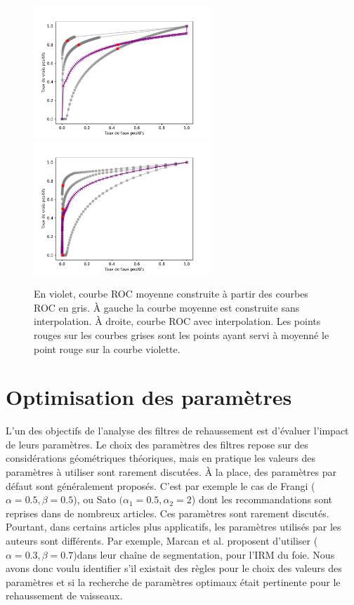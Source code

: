 \begin{figure}[ht]
  \centering
  \includegraphics[height=5cm]{Images/ROC_badMean.pdf}
  \includegraphics[height=5cm]{Images/ROC_goodMean.pdf}
  \caption{En violet, courbe ROC moyenne construite à partir des courbes ROC en gris. À gauche la courbe moyenne est construite sans interpolation. À droite, courbe ROC avec interpolation. Les points rouges sur les courbes grises sont les points ayant servi à moyenné le point rouge sur la courbe violette.}
  \label{fig:good_and_bad_roc}
\end{figure}

\section{Optimisation des paramètres}

L'un des objectifs de l'analyse des filtres de rehaussement est d'évaluer l'impact de leurs paramètres. Le choix des paramètres des filtres repose sur des considérations géométriques théoriques, mais en pratique les valeurs des paramètres à utiliser sont rarement discutées. À la place, des paramètres par défaut sont généralement proposés. C'est par exemple le cas de Frangi ($\alpha=0.5,\beta=0.5$), ou Sato $(\alpha_1=0.5,\alpha_2=2$) dont les recommandations sont reprises dans de nombreux articles. Ces paramètres sont rarement discutés. Pourtant, dans certains articles plus applicatifs, les paramètres utilisés par les auteurs sont différents. Par exemple, Marcan et al. \cite{Marcan2014_vessel_seg} proposent d'utiliser ($\alpha=0.3,\beta=0.7$)dans leur chaîne de segmentation,  pour l'IRM du foie. Nous avons donc voulu identifier s'il existait des règles pour le choix des valeurs des paramètres et si la recherche de paramètres optimaux était pertinente pour le rehaussement de vaisseaux.

